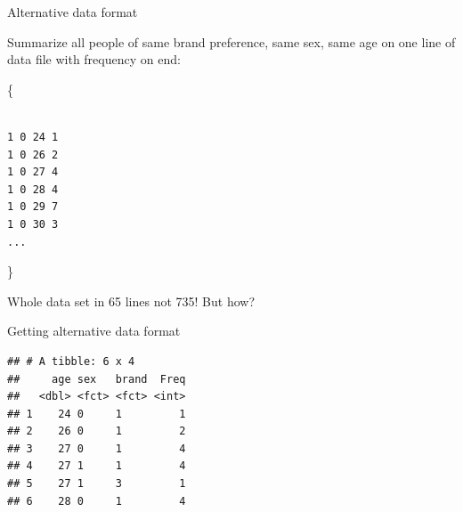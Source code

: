 \documentclass[ignorenonframetext,]{beamer}
\newenvironment{Shaded}{\begin{snugshade}}{\end{snugshade}}
\newcommand{\DataTypeTok}[1]{\textcolor[rgb]{0.13,0.29,0.53}{#1}}
\newcommand{\DecValTok}[1]{\textcolor[rgb]{0.00,0.00,0.81}{#1}}
\newcommand{\KeywordTok}[1]{\textcolor[rgb]{0.13,0.29,0.53}{\textbf{#1}}}
\newcommand{\NormalTok}[1]{#1}
\newcommand{\OperatorTok}[1]{\textcolor[rgb]{0.81,0.36,0.00}{\textbf{#1}}}
\newcommand{\StringTok}[1]{\textcolor[rgb]{0.31,0.60,0.02}{#1}}
\begin{document}
\begin{frame}[fragile]{Alternative data format}
\protect\hypertarget{alternative-data-format}{}

Summarize all people of same brand preference, same sex, same age on one
line of data file with frequency on end:

\{

\begin{verbatim}

1 0 24 1
1 0 26 2
1 0 27 4
1 0 28 4
1 0 29 7
1 0 30 3
...
\end{verbatim}

\}

Whole data set in 65 lines not 735! But how?

\end{frame}

\begin{frame}[fragile]{Getting alternative data format}
\protect\hypertarget{getting-alternative-data-format}{}

\begin{Shaded}
\end{Shaded}

\begin{verbatim}
## # A tibble: 6 x 4
##     age sex   brand  Freq
##   <dbl> <fct> <fct> <int>
## 1    24 0     1         1
## 2    26 0     1         2
## 3    27 0     1         4
## 4    27 1     1         4
## 5    27 1     3         1
## 6    28 0     1         4
\end{verbatim}

\end{frame}
\end{document}
